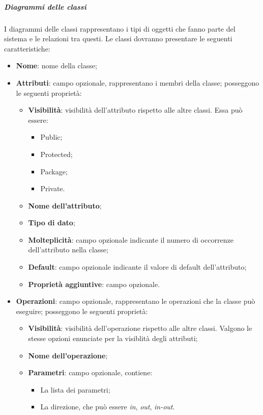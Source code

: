 \documentclass[../norme-di-progetto.tex]{subfiles}
\begin{document}
\subparagraph*{Diagrammi delle classi}
I diagrammi delle classi rappresentano i tipi di oggetti che fanno parte del sistema e le relazioni tra questi. Le classi dovranno presentare le seguenti caratteristiche:
\begin{itemize}
  \item \textbf{Nome}: nome della classe;
  \item \textbf{Attributi}: campo opzionale, rappresentano i membri della classe; posseggono le seguenti proprietà:
    \begin{itemize}
      \item \textbf{Visibilità}: visibilità dell'attributo rispetto alle altre classi. Essa può essere:
      \begin{itemize}
        \item Public;
        \item Protected;
        \item Package;
        \item Private.
      \end{itemize}
      \item \textbf{Nome dell'attributo};
      \item \textbf{Tipo di dato};
      \item \textbf{Molteplicità}: campo opzionale indicante il numero di occorrenze dell'attributo nella classe;
      \item \textbf{Default}: campo opzionale indicante il valore di default dell'attributo;
      \item \textbf{Proprietà aggiuntive}: campo opzionale.
    \end{itemize}
    \item \textbf{Operazioni}: campo opzionale, rappresentano le operazioni che la classe può eseguire; posseggono le seguenti proprietà:
    \begin{itemize}
      \item \textbf{Visibilità}: visibilità dell'operazione rispetto alle altre classi. Valgono le stesse opzioni enunciate per la visiblità degli attributi;
      \item \textbf{Nome dell'operazione};
      \item \textbf{Parametri}: campo opzionale, contiene:
      \begin{itemize}
        \item La lista dei parametri;
        \item La direzione, che può essere \textit{in}, \textit{out}, \textit{in-out}.
      \end{itemize}

\end{itemize}
\end{itemize}
\end{document}
